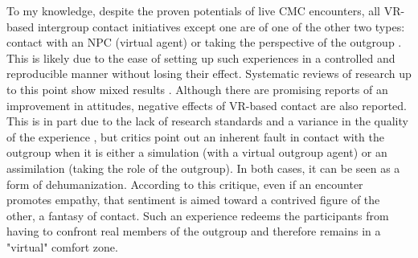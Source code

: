 \documentclass[dissertation,math,vertlayout,pdfa,colorlinks,nologo]{aaltoseries}
\begin{document}
To my knowledge, despite the proven potentials of live CMC encounters, all VR-based intergroup contact initiatives except one \cite{tassinariInvestigatingInfluenceIntergroup2022} are of one of the other two types: contact with an NPC (virtual agent) or taking the perspective of the outgroup \cite{chenFuturePrejudiceReduction2024, tassinariUseVirtualReality2021}. This is likely due to the ease of setting up such experiences in a controlled and reproducible manner without losing their effect. Systematic reviews of research up to this point show mixed results \cite{chenFuturePrejudiceReduction2024, tassinariUseVirtualReality2021}. Although there are promising reports of an improvement in attitudes, negative effects of VR-based contact are also reported. This is in part due to the lack of research standards and a variance in the quality of the experience \cite{tassinariUseVirtualReality2021}, but critics \cite{messeriLandUnrealVirtual2024, nashVirtualRealityWitness2018, bollmerEmpathyMachines2017} point out an inherent fault in contact with the outgroup when it is either a simulation (with a virtual outgroup agent) or an assimilation (taking the role of the outgroup). In both cases, it can be seen as a form of dehumanization. According to this critique, even if an encounter promotes empathy, that sentiment is aimed toward a contrived figure of the other, a fantasy of contact. Such an experience redeems the participants from having to confront real members of the outgroup and therefore remains in a "virtual" comfort zone. 
\end{document}
